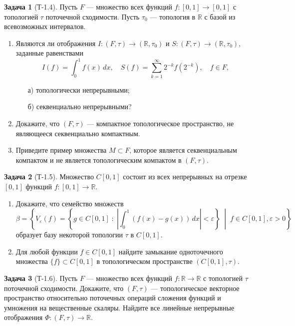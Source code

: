 \documentclass{article}
\theoremstyle{definition}
\newtheorem{problem}{Задача}
\newcommand{\R}{\mathbb R}
\newcommand{\eps}{\varepsilon}
\begin{document}
\begin{problem}[Т-1.4]
Пусть $F$ --- множество всех функций $f\colon [0,1]\to [0,1]$
с топологией $\tau$ поточечной сходимости.
Пусть $\tau_0$ --- топология в $\R$ с базой из всевозможных
интервалов.
\begin{enumerate}
\item Являются ли отображения $I\colon (F,\tau) \to (\R, \tau_0)$
и $S\colon (F,\tau) \to (\R, \tau_0)$, заданные равенствами
\begin{equation*}
I(f) = \int_0^1 f(x) \, dx,
\quad
S(f) = \sum_{k=1}^\infty 2^{-k} f(2^{-k}),
\quad
f\in F,
\end{equation*}
\begin{multicols}{2}
\begin{itemize}
\item[а)] топологически непрерывными;
\item[б)] секвенциально непрерывными?
\end{itemize}
\end{multicols}
\item Докажите, что $(F, \tau)$ --- компактное топологическое пространство,
не являющееся секвенциально компактным.
\item Приведите пример множества $M\subset F$, которое является секвенциальным компактом и не является топологическим компактом в $(F,\tau)$.
\end{enumerate}
\end{problem}

\begin{problem}[Т-1.5]
Множество $C[0,1]$ состоит из всех непрерывных на отрезке $[0,1]$ функций
$f\colon [0,1] \to \R$.
\begin{enumerate}
\item Докажите, что семейство множеств
\begin{equation*}
\beta = \left\{V_\eps(f) = \left\{g\in C[0,1] \;:\; \left|\int_0^1(f(x) - g(x))\,dx\right| < \eps \right\} \;\middle|\; f\in C[0,1], \eps>0 \right\}
\end{equation*}
образует базу некоторой топологии $\tau$ в $C[0,1]$.
\item Для любой функции $f\in C[0,1]$ найдите замыкание одноточечного множества $\{f\}\subset C[0,1]$ в топологическом пространстве $(C[0,1], \tau)$.
\end{enumerate}
\end{problem}

\begin{problem}[Т-1.6]
Пусть $F$ --- множество всех функций $f\colon \R\to\R$ с топологией $\tau$
поточечной сходимости. Докажите, что $(F,\tau)$ --- топологическое векторное
пространство относительно поточечных операций сложения функций и умножения на вещественные скаляры. Найдите все линейные непрерывные отображения $\Phi\colon (F,\tau) \to \R$.
\end{problem}
\end{document}
